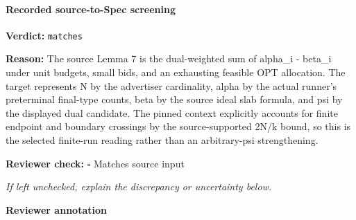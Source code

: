 \documentclass[10pt]{article}
\newcommand{\reviewerbox}{%
  \par\noindent\fbox{\parbox{0.96\linewidth}{\rule{0pt}{0.38in}}}\par
}
\newcommand{\reviewmatch}[1]{%
  \par\noindent\textbf{Reviewer check:} $\square$\; #1\par
  \noindent\emph{If left unchecked, explain the discrepancy or uncertainty below.}\par
}
\begin{document}
\paragraph{Recorded source-to-Spec screening}
\textbf{Verdict:} \texttt{matches}
\\
{\raggedright
\textbf{Reason:} The source Lemma 7 is the dual-\allowbreak{}weighted sum of alpha\_\allowbreak{}i -\allowbreak{} beta\_\allowbreak{}i under unit budgets, small bids, and an exhausting feasible OPT allocation.\allowbreak{} The target represents N by the advertiser cardinality, alpha by the actual runner's preterminal final-\allowbreak{}type counts, beta by the source ideal slab formula, and psi by the displayed dual candidate.\allowbreak{} The pinned context explicitly accounts for finite endpoint and boundary crossings by the source-\allowbreak{}supported 2N/\allowbreak{}k bound, so this is the selected finite-\allowbreak{}run reading rather than an arbitrary-\allowbreak{}psi strengthening.\allowbreak{}
\par}
\reviewmatch{Matches source input}
\noindent\textbf{Reviewer annotation}\par
\reviewerbox
\end{document}
